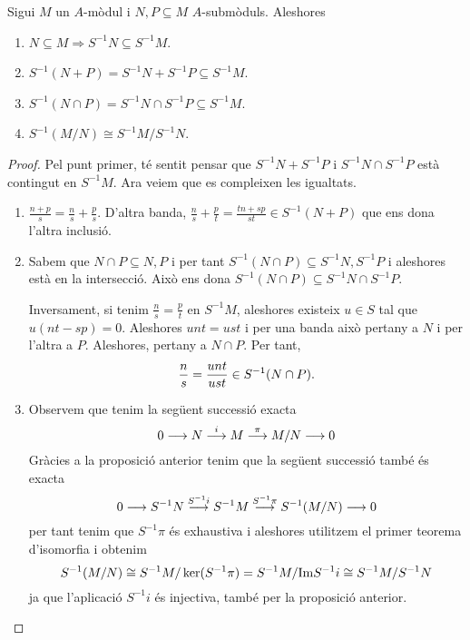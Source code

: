 \documentclass[../main.tex]{subfiles}
\begin{document}
\begin{coro}
Sigui $M$ un $A$-mòdul i $N,P\subseteq M$ $A$-submòduls. Aleshores
\begin{enumerate}[(0)]
    \item $N\subseteq M\Longrightarrow S^{-1}N\subseteq S^{-1}M$.
    \item $S^{-1}(N+P) = S^{-1}N+S^{-1}P\subseteq S^{-1}M$.
    \item $S^{-1}(N\cap P) = S^{-1}N\cap S^{-1}P\subseteq S^{-1}M$.
    \item $S^{-1}(M/N)\cong S^{-1}M/S^{-1}N$.
\end{enumerate}
\end{coro}
\begin{proof}
Pel punt primer, té sentit pensar que $S^{-1}N+S^{-1}P$ i $S^{-1}N\cap S^{-1}P$ està contingut en $S^{-1}M$. Ara veiem que es compleixen les igualtats.
\begin{enumerate}[(1)]
    \item $\frac{n+p}{s} = \frac{n}{s}+\frac{p}{s}$. D'altra banda, $\frac{n}{s}+\frac{p}{t} = \frac{tn+sp}{st} \in S^{-1}(N+P)$ que ens dona l'altra inclusió.
    \item Sabem que $N\cap P\subseteq N,P$ i per tant $S^{-1}(N\cap P)\subseteq S^{-1}N,S^{-1}P$ i aleshores està en la intersecció. Això ens dona $S^{-1}(N\cap P)\subseteq S^{-1}N\cap S^{-1}P$.
    
    Inversament, si tenim $\frac{n}{s} = \frac{p}{t}$ en $S^{-1}M$, aleshores existeix $u\in S$ tal que $u(nt-sp) = 0$. Aleshores $unt = ust$ i per una banda això pertany a $N$ i per l'altra a $P$. Aleshores, pertany a $N\cap P$. Per tant,
    \begin{equation}
        \notag
        \frac{n}{s} = \frac{unt}{ust}\in S^{-1}(N\cap P).
    \end{equation}
    
    \item Observem que tenim la següent successió exacta
    \begin{equation}
        \notag
        0\longrightarrow N\overset{i}{\longrightarrow} M\overset{\pi}{\longrightarrow} M/N\longrightarrow 0
    \end{equation}
    Gràcies a la proposició anterior tenim que la següent successió també és exacta
    \begin{equation}
        \notag
        0\longrightarrow S^{-1}N\overset{S^{-1}i}{\longrightarrow} S^{-1}M\overset{S^{-1}\pi}{\longrightarrow} S^{-1}(M/N)\longrightarrow 0
    \end{equation}
    per tant tenim que $S^{-1}\pi$ és exhaustiva i aleshores utilitzem el primer teorema d'isomorfia i obtenim
    \begin{equation}
        \notag
        S^{-1}(M/N)\cong S^{-1}M/\ker(S^{-1}\pi) = S^{-1}M/\mathrm{Im}S^{-1}i\cong S^{-1}M/S^{-1}N
    \end{equation}
    ja que l'aplicació $S^{-1}i$ és injectiva, també per la proposició anterior.
\end{enumerate}
\end{proof}
\end{document}
